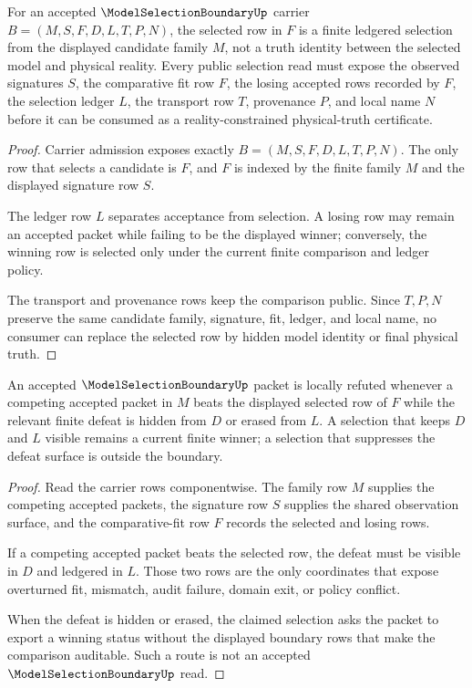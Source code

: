 \begin{theorem}
\label{thm:model-selection-boundary-fit-ledger-separation}
For an accepted $\ModelSelectionBoundaryUp$ carrier $B=(M,S,F,D,L,T,P,N)$, the selected row in $F$ is a finite ledgered selection from the displayed candidate family $M$, not a truth identity between the selected model and physical reality. Every public selection read must expose the observed signatures $S$, the comparative fit row $F$, the losing accepted rows recorded by $F$, the selection ledger $L$, the transport row $T$, provenance $P$, and local name $N$ before it can be consumed as a reality-constrained physical-truth certificate.
\end{theorem}
\begin{proof}
Carrier admission exposes exactly $B=(M,S,F,D,L,T,P,N)$. The only row that selects a candidate is $F$, and $F$ is indexed by the finite family $M$ and the displayed signature row $S$.

The ledger row $L$ separates acceptance from selection. A losing row may remain an accepted packet while failing to be the displayed winner; conversely, the winning row is selected only under the current finite comparison and ledger policy.

The transport and provenance rows keep the comparison public. Since $T,P,N$ preserve the same candidate family, signature, fit, ledger, and local name, no consumer can replace the selected row by hidden model identity or final physical truth.
\end{proof}

\begin{theorem}
\label{thm:model-selection-boundary-defeat-surface}
An accepted $\ModelSelectionBoundaryUp$ packet is locally refuted whenever a competing accepted packet in $M$ beats the displayed selected row of $F$ while the relevant finite defeat is hidden from $D$ or erased from $L$. A selection that keeps $D$ and $L$ visible remains a current finite winner; a selection that suppresses the defeat surface is outside the boundary.
\end{theorem}
\begin{proof}
Read the carrier rows componentwise. The family row $M$ supplies the competing accepted packets, the signature row $S$ supplies the shared observation surface, and the comparative-fit row $F$ records the selected and losing rows.

If a competing accepted packet beats the selected row, the defeat must be visible in $D$ and ledgered in $L$. Those two rows are the only coordinates that expose overturned fit, mismatch, audit failure, domain exit, or policy conflict.

When the defeat is hidden or erased, the claimed selection asks the packet to export a winning status without the displayed boundary rows that make the comparison auditable. Such a route is not an accepted $\ModelSelectionBoundaryUp$ read.
\end{proof}

